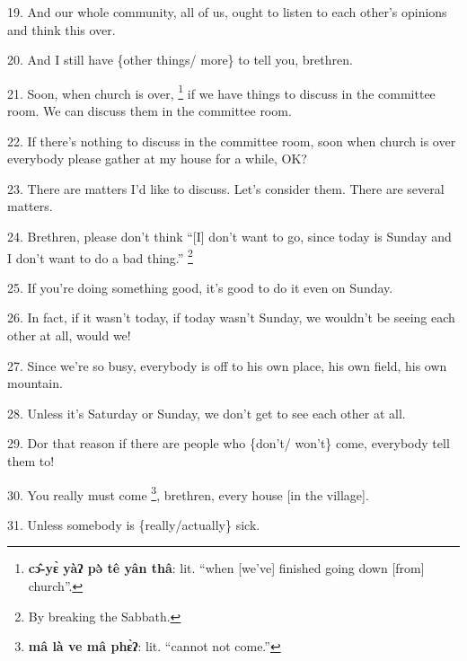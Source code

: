 19. And our whole community, all of us, ought to listen to each other's opinions
and think this over.

20. And I still have \{other things/ more\} to tell you, brethren.

21. Soon, when church is over, \footnote{\textbf{cɔ̂-yɛ̀ yàʔ pə̀ tê yân thâ}: lit. ``when [we've] finished going down [from] church''.} if we have things to discuss in the committee
room. We can discuss them in the committee room.

22. If there's nothing to discuss in the committee room, soon when church is over
everybody please gather at my house for a while, OK?

23. There are matters I'd like to discuss. Let's consider them. There are several
matters.

24. Brethren, please don't think ``[I] don't want to go, since today is Sunday
and I don't want to do a bad thing.'' \footnote{By breaking the Sabbath.}

25. If you're doing something good, it's good to do it even on Sunday.

26. In fact, if it wasn't today, if today wasn't Sunday, we wouldn't be seeing
each other at all, would we!

27. Since we're so busy, everybody is off to his own place, his own field, his
own mountain.

28. Unless it's Saturday or Sunday, we don't get to see each other at all.

29. Dor that reason if there are people who \{don't/ won't\} come, everybody tell
them to!

30. You really must come \footnote{\textbf{mâ là ve mâ phɛ̀ʔ}: lit. ``cannot not come.''}, brethren, every house [in the village].

31. Unless somebody is \{really/actually\} sick.

